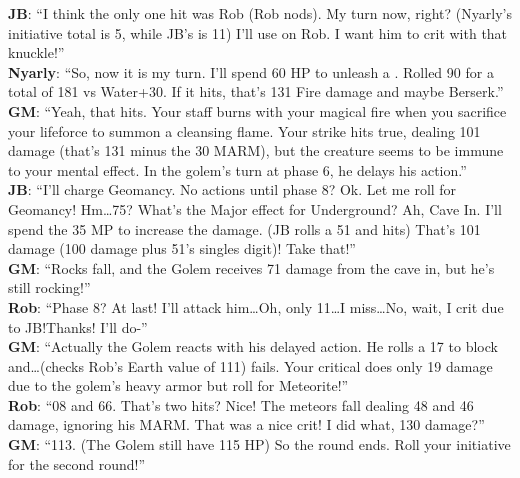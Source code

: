 \begin{multimog}
\textbf{JB}: \enquote{I think the only one hit was Rob (Rob nods). My turn now, right? (Nyarly's initiative total is 5, while JB's is 11) I'll use  on Rob. I want him to crit with that knuckle!} \\
\textbf{Nyarly}: \enquote{So, now it is my turn. I'll spend 60 HP to unleash a . Rolled 90 for a total of 181 vs Water+30. If it hits, that's 131 Fire damage and maybe Berserk.} \\
\textbf{GM}: \enquote{Yeah, that hits. Your staff burns with your magical fire when you sacrifice your lifeforce to summon a cleansing flame. Your strike hits true, dealing 101 damage (that's 131 minus the 30 MARM), but the creature seems to be immune to your mental effect. In the golem's turn at phase 6, he delays his action.} \\
\textbf{JB}: \enquote{I'll charge Geomancy. No actions until phase 8? Ok. Let me roll for Geomancy! Hm\ldots 75? What’s the Major effect for Underground? Ah, Cave In. I'll spend the 35 MP to increase the damage. (JB rolls a 51 and hits) That's 101 damage (100 damage plus 51's singles digit)! Take that!} \\
\textbf{GM}: \enquote{Rocks fall, and the Golem receives 71 damage from the cave in, but he's still rocking!} \\
\textbf{Rob}: \enquote{Phase 8? At last! I'll attack him\ldots Oh, only 11\ldots I miss\ldots No, wait, I crit due to JB!\@{}Thanks! I'll do-} \\
\textbf{GM}: \enquote{Actually the Golem reacts with his delayed action. He rolls a 17 to block and\ldots (checks Rob's Earth value of 111) fails. Your critical does only 19 damage due to the golem's heavy armor but roll for Meteorite!} \\
\textbf{Rob}: \enquote{08 and 66. That's two hits? Nice! The meteors fall dealing 48 and 46 damage, ignoring his MARM\@. That was a nice crit! I did what, 130 damage?} \\
\textbf{GM}: \enquote{113. (The Golem still have 115 HP) So the round ends. Roll your initiative for the second round!} \\ 
\end{multimog}

